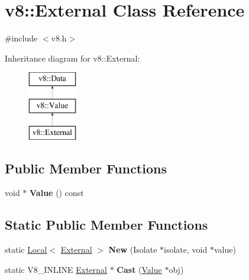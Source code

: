 \hypertarget{classv8_1_1External}{}\section{v8\+:\+:External Class Reference}
\label{classv8_1_1External}


{\ttfamily \#include $<$v8.\+h$>$}

Inheritance diagram for v8\+:\+:External\+:\begin{figure}[H]
\begin{center}
\leavevmode
\includegraphics[height=3.000000cm]{classv8_1_1External}
\end{center}
\end{figure}
\subsection*{Public Member Functions}
\begin{DoxyCompactItemize}
\item 
\mbox{\label{classv8_1_1External_a5d5f967787189f6e2e35c51836862777}} 
void $\ast$ {\bfseries Value} () const
\end{DoxyCompactItemize}
\subsection*{Static Public Member Functions}
\begin{DoxyCompactItemize}
\item 
\mbox{\label{classv8_1_1External_a1e877f692e95f13ac3102707ce8cbab9}} 
static \mbox{\hyperlink{classv8_1_1Local}{Local}}$<$ \mbox{\hyperlink{classv8_1_1External}{External}} $>$ {\bfseries New} (Isolate $\ast$isolate, void $\ast$value)
\item 
\mbox{\label{classv8_1_1External_a4711aba26710c5dd72f11cb81808f9c2}} 
static V8\+\_\+\+I\+N\+L\+I\+NE \mbox{\hyperlink{classv8_1_1External}{External}} $\ast$ {\bfseries Cast} (\mbox{\hyperlink{classv8_1_1Value}{Value}} $\ast$obj)
\end{DoxyCompactItemize}


